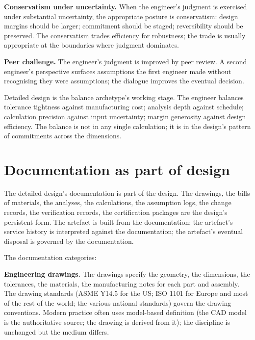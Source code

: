 \textbf{Conservatism under uncertainty.} When the engineer's judgment is exercised under substantial uncertainty, the appropriate posture is conservatism: design margins should be larger; commitment should be staged; reversibility should be preserved. The conservatism trades efficiency for robustness; the trade is usually appropriate at the boundaries where judgment dominates.

\textbf{Peer challenge.} The engineer's judgment is improved by peer review. A second engineer's perspective surfaces assumptions the first engineer made without recognising they were assumptions; the dialogue improves the eventual decision.

\begin{archetype}[balance]
Detailed design is the balance archetype's working stage. The engineer balances tolerance tightness against manufacturing cost; analysis depth against schedule; calculation precision against input uncertainty; margin generosity against design efficiency. The balance is not in any single calculation; it is in the design's pattern of commitments across the dimensions.
\end{archetype}

\section{Documentation as part of design}

The detailed design's documentation is part of the design. The drawings, the bills of materials, the analyses, the calculations, the assumption logs, the change records, the verification records, the certification packages are the design's persistent form. The artefact is built from the documentation; the artefact's service history is interpreted against the documentation; the artefact's eventual disposal is governed by the documentation.

The documentation categories:

\textbf{Engineering drawings.} The drawings specify the geometry, the dimensions, the tolerances, the materials, the manufacturing notes for each part and assembly. The drawing standards (ASME Y14.5 for the US; ISO 1101 for Europe and most of the rest of the world; the various national standards) govern the drawing conventions. Modern practice often uses model-based definition (the CAD model is the authoritative source; the drawing is derived from it); the discipline is unchanged but the medium differs.

